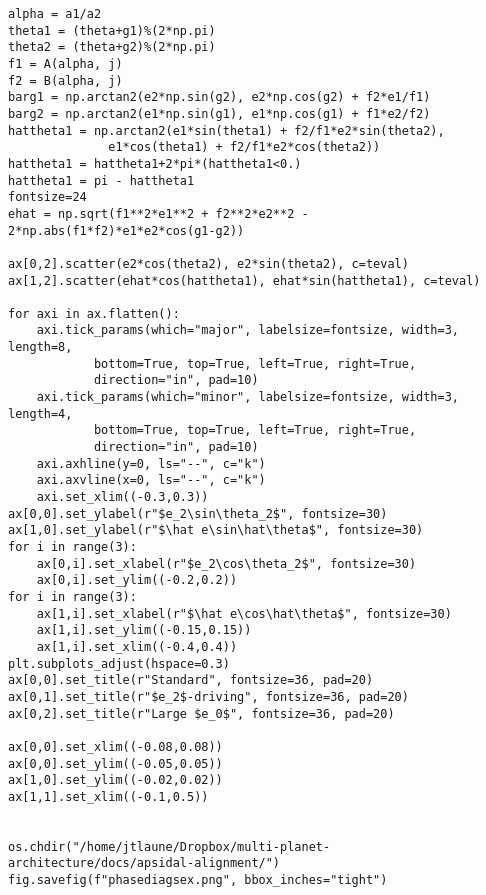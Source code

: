 \documentclass[11pt]{article}
\begin{document}
\begin{verbatim}
alpha = a1/a2
theta1 = (theta+g1)%(2*np.pi)
theta2 = (theta+g2)%(2*np.pi)
f1 = A(alpha, j)
f2 = B(alpha, j)
barg1 = np.arctan2(e2*np.sin(g2), e2*np.cos(g2) + f2*e1/f1)
barg2 = np.arctan2(e1*np.sin(g1), e1*np.cos(g1) + f1*e2/f2)
hattheta1 = np.arctan2(e1*sin(theta1) + f2/f1*e2*sin(theta2),
		      e1*cos(theta1) + f2/f1*e2*cos(theta2))
hattheta1 = hattheta1+2*pi*(hattheta1<0.)
hattheta1 = pi - hattheta1
fontsize=24
ehat = np.sqrt(f1**2*e1**2 + f2**2*e2**2 - 2*np.abs(f1*f2)*e1*e2*cos(g1-g2))

ax[0,2].scatter(e2*cos(theta2), e2*sin(theta2), c=teval)
ax[1,2].scatter(ehat*cos(hattheta1), ehat*sin(hattheta1), c=teval)

for axi in ax.flatten():
    axi.tick_params(which="major", labelsize=fontsize, width=3, length=8,
		    bottom=True, top=True, left=True, right=True,
		    direction="in", pad=10)
    axi.tick_params(which="minor", labelsize=fontsize, width=3, length=4,
		    bottom=True, top=True, left=True, right=True,
		    direction="in", pad=10)
    axi.axhline(y=0, ls="--", c="k")
    axi.axvline(x=0, ls="--", c="k")
    axi.set_xlim((-0.3,0.3))
ax[0,0].set_ylabel(r"$e_2\sin\theta_2$", fontsize=30)
ax[1,0].set_ylabel(r"$\hat e\sin\hat\theta$", fontsize=30)
for i in range(3):
    ax[0,i].set_xlabel(r"$e_2\cos\theta_2$", fontsize=30)
    ax[0,i].set_ylim((-0.2,0.2))
for i in range(3):
    ax[1,i].set_xlabel(r"$\hat e\cos\hat\theta$", fontsize=30)
    ax[1,i].set_ylim((-0.15,0.15))
    ax[1,i].set_xlim((-0.4,0.4))
plt.subplots_adjust(hspace=0.3)
ax[0,0].set_title(r"Standard", fontsize=36, pad=20)
ax[0,1].set_title(r"$e_2$-driving", fontsize=36, pad=20)
ax[0,2].set_title(r"Large $e_0$", fontsize=36, pad=20)

ax[0,0].set_xlim((-0.08,0.08))
ax[0,0].set_ylim((-0.05,0.05))
ax[1,0].set_ylim((-0.02,0.02))
ax[1,1].set_xlim((-0.1,0.5))


os.chdir("/home/jtlaune/Dropbox/multi-planet-architecture/docs/apsidal-alignment/")
fig.savefig(f"phasediagsex.png", bbox_inches="tight")
\end{verbatim}
\end{document}
